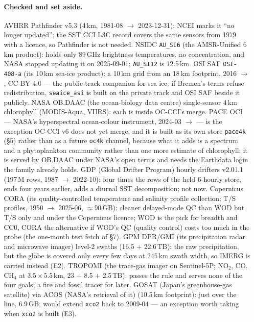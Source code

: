 \documentclass[10pt]{article}
\newcommand{\code}[1]{\texttt{#1}}
\begin{document}
\paragraph{Checked and set aside.} AVHRR Pathfinder v5.3 (4\,km, 1981-08 $\to$
2023-12-31): NCEI marks it ``no longer updated''; the SST CCI L3C record covers
the same sensors from 1979 with a licence, so Pathfinder is not needed.
NSIDC \code{AU\_SI6} (the AMSR-Unified 6\,km product): holds only 89\,GHz brightness temperatures, no
concentration, and NASA stopped updating it on 2025-09-01; \code{AU\_SI12} is
12.5\,km. OSI SAF \code{OSI-408-a} (its 10\,km sea-ice product): a 10\,km grid from an 18\,km footprint,
2016 $\to$, CC BY 4.0 --- the public-track companion for sea ice; if Bremen's terms
refuse redistribution, \code{seaice\_asi} is built on the private track and
OSI SAF beside it publicly. NASA OB.DAAC (the ocean-biology data centre) single-sensor 4\,km chlorophyll (MODIS-Aqua,
VIIRS): each is inside OC-CCI's merge. PACE OCI --- NASA's hyperspectral
ocean-colour instrument, 2024-03 $\to$ --- is the exception OC-CCI v6 does
not yet merge, and it is built as its own store \code{pace4k} (\S5) rather
than as a future \code{oc4k} channel, because what it adds is a spectrum and
a phytoplankton community rather than one more estimate of chlorophyll; it
is served by OB.DAAC under NASA's open terms and needs the Earthdata login
the family already holds. GDP (Global Drifter Program) hourly drifters v2.01.1 (197\,M rows, 1987 $\to$ 2022-10): four
times the rows of the held 6-hourly store, ends four years earlier, adds a
diurnal SST decomposition; not now. Copernicus CORA (its quality-controlled temperature and salinity profile collection; T/S profiles, 1950 $\to$
2025-06, $\approx 90$\,GB): cleaner delayed-mode QC than WOD but T/S only and
under the Copernicus licence; WOD is the pick for breadth and CC0, CORA the
alternative if WOD's QC (quality control) costs too much in the probe (the one-month test fetch of \S7). GPM DPR/GMI (its precipitation radar and microwave imager) level-2
swaths (16.5 + 22.6\,TB): the raw precipitation, but the globe is covered only
every few days at 245\,km swath width, so IMERG is carried instead (E2).
TROPOMI (the trace-gas imager on Sentinel-5P; NO$_2$, CO, CH$_4$ at $3.5 \times 5.5$\,km, 23 + 8.5 + 2.5\,TB):
passes the rule and serves none of the four goals; a fire and fossil tracer
for later. GOSAT (Japan's greenhouse-gas satellite) via ACOS (NASA's retrieval of it) (10.5\,km footprint): just over the line, 6.9\,GB;
would extend \code{xco2} back to 2009-04 --- an exception worth taking when
\code{xco2} is built (E3).
\end{document}
